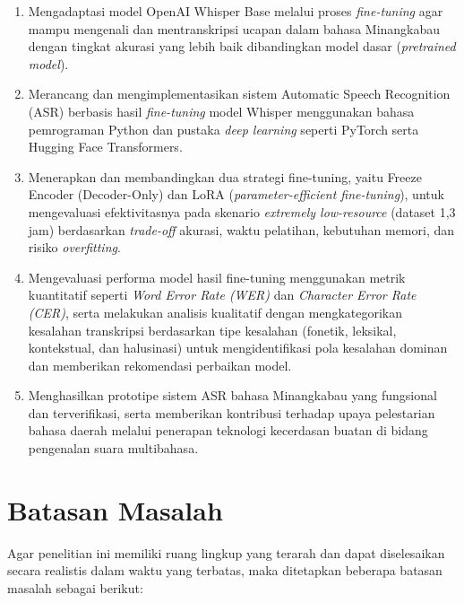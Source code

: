 \begin{enumerate}
    \item Mengadaptasi model OpenAI Whisper Base melalui proses \textit{fine-tuning} agar mampu mengenali dan mentranskripsi ucapan dalam bahasa Minangkabau dengan tingkat akurasi yang lebih baik dibandingkan model dasar (\textit{pretrained model}).
    
    \item Merancang dan mengimplementasikan sistem Automatic Speech Recognition (ASR) berbasis hasil \textit{fine-tuning} model Whisper menggunakan bahasa pemrograman Python dan pustaka \textit{deep learning} seperti PyTorch serta Hugging Face Transformers.
    
    \item Menerapkan dan membandingkan dua strategi fine-tuning, yaitu Freeze Encoder (Decoder-Only) dan LoRA (\textit{parameter-efficient fine-tuning}), untuk mengevaluasi efektivitasnya pada skenario \textit{extremely low-resource} (dataset 1,3 jam) berdasarkan \textit{trade-off} akurasi, waktu pelatihan, kebutuhan memori, dan risiko \textit{overfitting}.
    \item Mengevaluasi performa model hasil fine-tuning menggunakan metrik kuantitatif seperti \textit{Word Error Rate (WER)} dan \textit{Character Error Rate (CER)}, serta melakukan analisis kualitatif dengan mengkategorikan kesalahan transkripsi berdasarkan tipe kesalahan (fonetik, leksikal, kontekstual, dan halusinasi) untuk mengidentifikasi pola kesalahan dominan dan memberikan rekomendasi perbaikan model.

    
    \item Menghasilkan prototipe sistem ASR bahasa Minangkabau yang fungsional dan terverifikasi, serta memberikan kontribusi terhadap upaya pelestarian bahasa daerah melalui penerapan teknologi kecerdasan buatan di bidang pengenalan suara multibahasa.
\end{enumerate}

\section{Batasan Masalah} \label{I.Batasan}
Agar penelitian ini memiliki ruang lingkup yang terarah dan dapat diselesaikan secara realistis dalam waktu yang terbatas, maka ditetapkan beberapa batasan masalah sebagai berikut:

